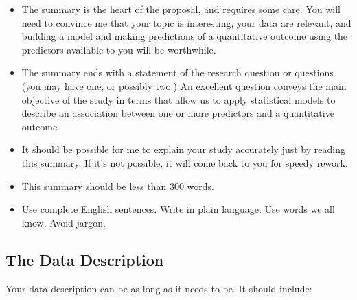 \documentclass[]{book}
\providecommand{\tightlist}{%
  \setlength{\itemsep}{0pt}\setlength{\parskip}{0pt}}
\theoremstyle{definition}
\theoremstyle{definition}
\theoremstyle{definition}
\theoremstyle{remark}
\begin{document}
\begin{itemize}
\tightlist
\item
  The summary is the heart of the proposal, and requires some care. You
  will need to convince me that your topic is interesting, your data are
  relevant, and building a model and making predictions of a
  quantitative outcome using the predictors available to you will be
  worthwhile.
\item
  The summary ends with a statement of the research question or
  questions (you may have one, or possibly two.) An excellent question
  conveys the main objective of the study in terms that allow us to
  apply statistical models to describe an association between one or
  more predictors and a quantitative outcome.
\item
  It should be possible for me to explain your study accurately just by
  reading this summary. If it's not possible, it will come back to you
  for speedy rework.
\item
  This summary should be less than 300 words.
\item
  Use complete English sentences. Write in plain language. Use words we
  all know. Avoid jargon.
\end{itemize}

\hypertarget{the-data-description}{%
\subsection{The Data Description}\label{the-data-description}}

Your data description can be as long as it needs to be. It should
include:
\end{document}
